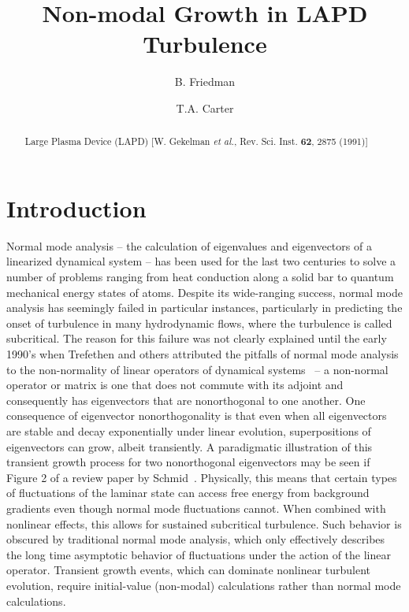 \documentclass[showpacs,preprintnumbers,amsmath,amssymb,superscriptaddress,aip]{revtex4-1}
\begin{document}
\title{Non-modal Growth in LAPD Turbulence}

\author{B. Friedman}

\author{T.A. Carter}




\begin{abstract}
Large Plasma Device (LAPD) [W. Gekelman \emph{et al.}, Rev. Sci. Inst. {\bf 62}, 2875 (1991)] 
\end{abstract}

\maketitle

\section{Introduction}

Normal mode analysis -- the calculation of eigenvalues and eigenvectors of a linearized dynamical system -- has been used for the last two centuries to solve a number of problems ranging from
heat conduction along a solid bar to quantum mechanical energy states of atoms. Despite its wide-ranging success, normal mode analysis has seemingly failed in particular instances,
particularly in predicting the onset of turbulence in many hydrodynamic flows, where the turbulence is called subcritical. 
The reason for this failure was not clearly explained until the early 1990's when Trefethen and others attributed the pitfalls of normal mode analysis to the non-normality of linear operators of
dynamical systems~\cite{trefethen1993,trefethen2005} -- a non-normal operator or matrix is one that does not commute with its adjoint and consequently has 
eigenvectors that are nonorthogonal to one another. One consequence of eigenvector nonorthogonality is that even when all eigenvectors are stable and decay exponentially under linear evolution, 
superpositions of eigenvectors can grow, albeit transiently.
A paradigmatic illustration of this transient growth process for two nonorthogonal eigenvectors may be seen if Figure 2 of a review paper by Schmid~\cite{schmid2007}.
Physically, this means that certain types of fluctuations of the laminar state can access free energy from background gradients even though normal mode fluctuations cannot.
When combined with nonlinear effects, this allows for sustained subcritical turbulence.
Such behavior is obscured by traditional normal mode analysis, which only effectively describes the long time asymptotic behavior of fluctuations under the 
action of the linear operator. Transient growth events, which can dominate nonlinear turbulent evolution, require initial-value (non-modal) calculations rather than normal mode calculations.
\end{document}
